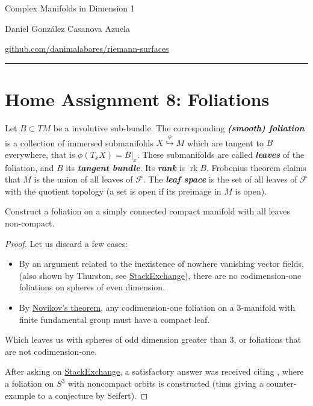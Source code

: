 \documentclass{article}
\newcommand{\Fc}{\mathcal{F}}
\DeclareMathOperator{\rk}{rk}
\begin{document}
\begin{minipage}{\textwidth}
	\begin{minipage}{.5\textwidth}
		Complex Manifolds in Dimension 1
	\end{minipage}%
	\begin{minipage}{.5\textwidth}
		\raggedleft
		Daniel González Casanova Azuela\par
		{\small\href{https://github.com/danimalabares/riemann-surfaces}{github.com/danimalabares/riemann-surfaces}}
	\end{minipage}%
\end{minipage}\vspace{.2cm}\hrule
\section{Home Assignment 8: Foliations}
\setcounter{section}{8}
\begin{defn}
	Let $B\subset TM$ be a involutive sub-bundle. The corresponding \textbf{\textit{(smooth) foliation}} is a collection of immersed submanifolds $X\overset{\phi}{\hookrightarrow}M$ which are tangent to $B$ everywhere, that is $\phi(T_xX)=B|_x$. These submanifolds are called \textbf{\textit{leaves}} of the foliation, and $B$ its \textbf{\textit{tangent bundle}}. Its \textbf{\textit{rank}} is $\rk B$. Frobenius theorem claims that $M$ is the union of all leaves of $\Fc$. The \textbf{\textit{leaf space}} is the set of all leaves of $\Fc$ with the quotient topology (a set is open if its preimage in $M$ is open).
\end{defn}
\begin{exercise}
	Construct a foliation on a simply connected compact manifold with all leaves non-compact.
\end{exercise}
\begin{proof}
	Let us discard a few cases:
	\begin{itemize}
		\item By an argument related to the inexistence of nowhere vanishing vector fields, (also shown by Thurston, see \href{https://math.stackexchange.com/questions/2207862/foliations-of-spheres}{StackExchange}), there are no codimension-one foliations on spheres of even dimension.
		\item By \href{https://en.wikipedia.org/wiki/Novikov%27s_compact_leaf_theorem#Novikov's_compact_leaf_theorem_for_any_M3}{Novikov's theorem}, any codimension-one foliation on a 3-manifold with finite fundamental group must have a compact leaf.
	\end{itemize}
	Which leaves us with spheres of odd dimension greater than 3, or foliations that are not codimension-one.
	
	After asking on \href{https://math.stackexchange.com/questions/4922971/construct-a-foliation-on-a-simply-connected-compact-manifold-with-all-leaves-non/4924661#4924661}{StackExchange}, a satisfactory answer was received citing \cite{seifert}, where a foliation on $S^3$ with noncompact orbits is constructed (thus giving a counter-example to a conjecture by Seifert).
\end{proof}
\end{document}
